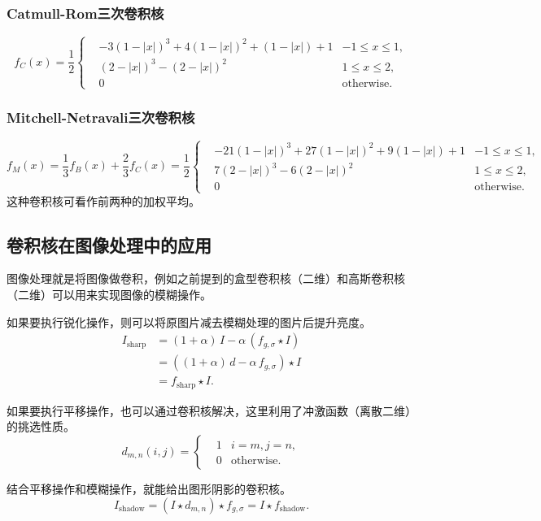 \documentclass{ctexart}
\begin{document}
	\subsubsection{Catmull-Rom三次卷积核}
	$$
	f_C(x)=\frac12\left\{
		\begin{aligned}
			&-3(1-|x|)^3+4(1-|x|)^2+(1-|x|)+1&-1\leqslant x\leqslant 1,\\
			&(2-|x|)^3-(2-|x|)^2&1\leqslant x\leqslant 2,\\
			&0&\text{otherwise}.
		\end{aligned}
	\right.
	$$

	\subsubsection{Mitchell-Netravali三次卷积核}
	$$
	f_M(x)=\frac13f_B(x)+\frac23f_C(x)=\frac12\left\{
		\begin{aligned}
			&-21(1-|x|)^3+27(1-|x|)^2+9(1-|x|)+1&-1\leqslant x\leqslant 1,\\
			&7(2-|x|)^3-6(2-|x|)^2&1\leqslant x\leqslant 2,\\
			&0&\text{otherwise}.
		\end{aligned}
	\right.
	$$
	这种卷积核可看作前两种的加权平均。

	\subsection{卷积核在图像处理中的应用}
	图像处理就是将图像做卷积，例如之前提到的盒型卷积核（二维）和高斯卷积核（二维）可以用来实现图像的模糊操作。

	如果要执行锐化操作，则可以将原图片减去模糊处理的图片后提升亮度。
	\[
		\begin{aligned}
			I_{\text{sharp}}&=(1+\alpha)\,I-\alpha\,(f_{g,\sigma}\star I)\\
			&=((1+\alpha)\,d-\alpha\,f_{g,\sigma})\star I\\
			&=f_{\text{sharp}}\star I.
		\end{aligned}
	\]

	如果要执行平移操作，也可以通过卷积核解决，这里利用了冲激函数（离散二维）的挑选性质。
	\[
		d_{m,n}(i,j)=\left\{
			\begin{aligned}
				&1&i=m,j=n,\\
				&0&\text{otherwise}.
			\end{aligned}
		\right.
	\]

	结合平移操作和模糊操作，就能给出图形阴影的卷积核。
	\[
		I_{\text{shadow}}=(I\star d_{m,n})\star f_{g,\sigma}=I\star f_{\text{shadow}}.
	\]
\end{document}
